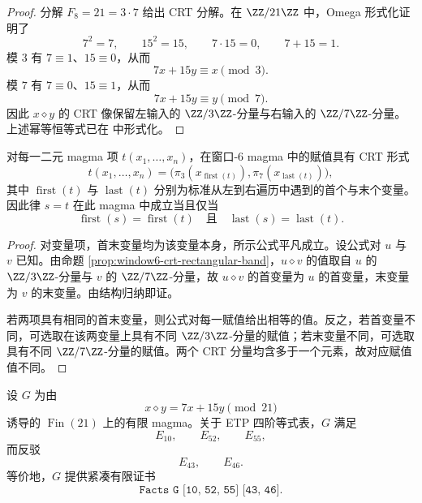 \documentclass[../../main.tex]{subfiles}
\begin{document}
\begin{proof}
分解 \(F_8=21=3\cdot 7\) 给出 CRT 分解。在 \(\ZZ/21\ZZ\) 中，Omega 形式化证明了
\[
    7^2=7,\qquad 15^2=15,\qquad 7\cdot 15=0,\qquad 7+15=1.
\]
模 \(3\) 有 \(7\equiv 1\)、\(15\equiv 0\)，从而
\[
    7x+15y\equiv x\pmod 3.
\]
模 \(7\) 有 \(7\equiv 0\)、\(15\equiv 1\)，从而
\[
    7x+15y\equiv y\pmod 7.
\]
因此 \(x\diamond y\) 的 CRT 像保留左输入的 \(\ZZ/3\ZZ\)-分量与右输入的 \(\ZZ/7\ZZ\)-分量。上述幂等恒等式已在
\texttt{} 中形式化。
\end{proof}

\begin{lemma}[首末变量分类器]\label{lem:window6-first-last-classifier}
对每一二元 magma 项 \(t(x_1,\ldots,x_n)\)，在窗口-\(6\) magma 中的赋值具有 CRT 形式
\[
    t(x_1,\ldots,x_n)
    =
    \bigl(\pi_3(x_{\operatorname{first}(t)}),
          \pi_7(x_{\operatorname{last}(t)})\bigr),
\]
其中 \(\operatorname{first}(t)\) 与 \(\operatorname{last}(t)\) 分别为标准从左到右遍历中遇到的首个与末个变量。因此律 \(s=t\) 在此 magma 中成立当且仅当
\[
    \operatorname{first}(s)=\operatorname{first}(t)
    \quad\text{且}\quad
    \operatorname{last}(s)=\operatorname{last}(t).
\]
\end{lemma}

\begin{proof}
对变量项，首末变量均为该变量本身，所示公式平凡成立。设公式对 \(u\) 与 \(v\) 已知。由命题 \ref{prop:window6-crt-rectangular-band}，\(u\diamond v\) 的值取自 \(u\) 的 \(\ZZ/3\ZZ\)-分量与 \(v\) 的 \(\ZZ/7\ZZ\)-分量，故 \(u\diamond v\) 的首变量为 \(u\) 的首变量，末变量为 \(v\) 的末变量。由结构归纳即证。

若两项具有相同的首末变量，则公式对每一赋值给出相等的值。反之，若首变量不同，可选取在该两变量上具有不同 \(\ZZ/3\ZZ\)-分量的赋值；若末变量不同，可选取具有不同 \(\ZZ/7\ZZ\)-分量的赋值。两个 CRT 分量均含多于一个元素，故对应赋值值不同。
\end{proof}

\begin{theorem}[窗口-\(6\) 有限证书]\label{thm:window6-fin21-facts-certificate}
设 \(G\) 为由
\[
    x\diamond y=7x+15y\pmod {21}
\]
诱导的 \(\operatorname{Fin}(21)\) 上的有限 magma。关于 ETP 四阶等式表，\(G\) 满足
\[
    E_{10},\qquad E_{52},\qquad E_{55},
\]
而反驳
\[
    E_{43},\qquad E_{46}.
\]
等价地，\(G\) 提供紧凑有限证书
\[
    \texttt{Facts G [10, 52, 55] [43, 46]}.
\]
\end{theorem}
\end{document}
